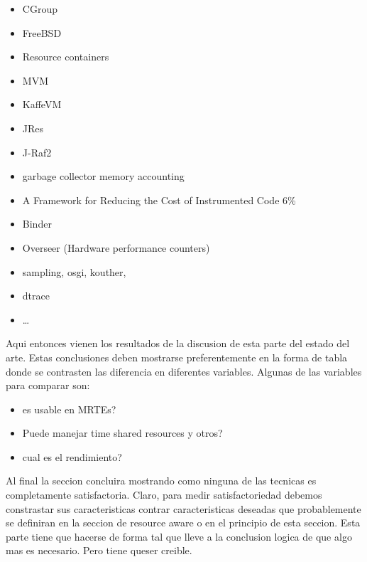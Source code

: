 \begin{itemize}
\item CGroup \cite{Soltesz:2007:COS:1272998.1273025}
\item FreeBSD \cite{Kamp00jails:confining}
\item Resource containers \cite{Banga:1999:RCN:296806.296810} 
\item MVM \cite{czajkowski_multitasking_2001}
\item KaffeVM \cite{back_processes_2000,Back:2005:KJR:1075382.1075383}
\item JRes \cite{czajkowski_jres:_1998}
\item J-Raf2 \cite{Binder200657,Hulaas:2008:PTL}
\item garbage collector memory accounting \cite{Price:2003:GCM:829515.830545, gael}
\item A Framework for Reducing the Cost of Instrumented Code \cite{citeulike:481405} 6\%
\item Binder \cite{Binder:2009:PPV:1464245.1464249,Binder200645}
\item Overseer (Hardware performance counters) \cite{DBLP:conf/pppj/PeternierBBP11}
\item sampling, osgi, kouther, \cite{Maurel:2012:AME:2304736.2304763}
\item dtrace
\item \dots
\end{itemize}

Aqui entonces vienen los resultados de la discusion de esta parte del estado del arte.
Estas conclusiones deben mostrarse preferentemente en la forma de tabla donde se contrasten las diferencia en diferentes variables. Algunas de las variables para comparar son:

\begin{itemize}
\item es usable en MRTEs?
\item Puede manejar time shared resources y otros?
\item cual es el rendimiento?
\end{itemize}

Al final la seccion concluira mostrando como ninguna de las tecnicas es completamente satisfactoria. Claro, para medir satisfactoriedad debemos constrastar sus caracteristicas contrar caracteristicas deseadas que probablemente se definiran en la seccion de resource aware o en el principio de esta seccion. Esta parte tiene que hacerse de forma tal que lleve a la conclusion logica de que algo mas es necesario. Pero tiene queser creible.

